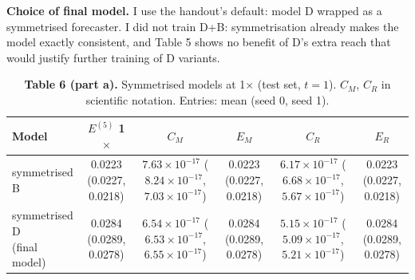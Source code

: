 \textbf{Choice of final model.} I use the handout's default: model D wrapped as a symmetrised forecaster. I did not train D+B: symmetrisation already makes the model exactly consistent, and Table 5 shows no benefit of D's extra reach that would justify further training of D variants.

\begin{table}[H]
\centering\small
\begin{adjustbox}{max width=\textwidth}
\begin{tabular}{@{}lccccc@{}}
\toprule
\textbf{Model} & \textbf{$E^{(5)}$ 1$\times$} & \textbf{$C_M$} & \textbf{$E_M$} & \textbf{$C_R$} & \textbf{$E_R$} \\
\midrule
symmetrised B & \makecell{0.0223\\[-1pt]{\tiny(0.0227, 0.0218)}} & \makecell{$7.63\times10^{-17}$\\[-1pt]{\tiny($8.24\times10^{-17}$, $7.03\times10^{-17}$)}} & \makecell{0.0223\\[-1pt]{\tiny(0.0227, 0.0218)}} & \makecell{$6.17\times10^{-17}$\\[-1pt]{\tiny($6.68\times10^{-17}$, $5.67\times10^{-17}$)}} & \makecell{0.0223\\[-1pt]{\tiny(0.0227, 0.0218)}} \\
\makecell[l]{symmetrised D\\(final model)} & \makecell{0.0284\\[-1pt]{\tiny(0.0289, 0.0278)}} & \makecell{$6.54\times10^{-17}$\\[-1pt]{\tiny($6.53\times10^{-17}$, $6.55\times10^{-17}$)}} & \makecell{0.0284\\[-1pt]{\tiny(0.0289, 0.0278)}} & \makecell{$5.15\times10^{-17}$\\[-1pt]{\tiny($5.09\times10^{-17}$, $5.21\times10^{-17}$)}} & \makecell{0.0284\\[-1pt]{\tiny(0.0289, 0.0278)}} \\
\bottomrule
\end{tabular}
\end{adjustbox}
\caption*{\textbf{Table 6 (part a).} Symmetrised models at 1$\times$ (test set, $t=1$). $C_M$, $C_R$ in scientific notation. Entries: mean (seed 0, seed 1).}
\end{table}

